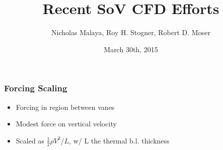 \documentclass[mathserif]{beamer}
\date{March 30th, 2015}
\author[Malaya, Stogner, Moser]{Nicholas Malaya, Roy H. Stogner, Robert
D. Moser}
\institute{The University of Texas at Austin}
\title[\libMesh]{Recent SoV CFD Efforts}
\begin{document}


\begin{frame}
 \frametitle{Forcing Scaling}
 \begin{itemize}
 \item Forcing in region between vanes
 \item Modest force on vertical velocity
 \item Scaled as $\frac{1}{2}\rho V^2 / L$, w/ L the thermal b.l. thickness
 \end{itemize}
\end{frame}


%
%
\end{document}
